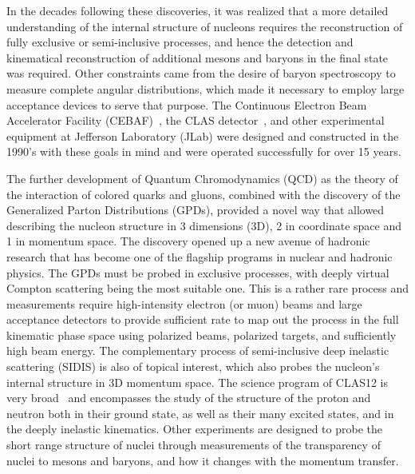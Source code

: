 \documentclass[final,3p,twocolumn]{elsarticle}
\begin{document}
In the decades following these discoveries, it was realized that a more detailed understanding of the internal
structure of nucleons requires the reconstruction of fully exclusive or semi-inclusive processes, and hence the
detection and kinematical reconstruction of additional mesons and baryons in the final state was required.  Other
constraints came from the desire of baryon spectroscopy to measure complete angular distributions, which made it
necessary to employ large acceptance devices to serve that purpose. The Continuous Electron Beam Accelerator
Facility (CEBAF)~\cite{Leemann:2001dg}, the CLAS detector~\cite{Mecking:2003zu}, and other experimental
equipment at Jefferson Laboratory (JLab) were designed and constructed in the 1990's with these goals in mind
and were operated successfully for over 15 years. 

The further development of Quantum Chromodynamics (QCD) as the theory of the interaction of colored quarks and
gluons, combined with the discovery of the Generalized Parton Distributions (GPDs), provided a novel way that allowed
describing the nucleon structure in 3 dimensions (3D), 2 in coordinate space and 1 in momentum space. The discovery
opened up a new avenue of hadronic research that has become one of the flagship programs in nuclear and hadronic
physics. The GPDs must be probed in exclusive processes, with deeply virtual Compton scattering being the most
suitable one. This is a rather rare process and measurements require high-intensity electron (or muon) beams and
large acceptance detectors to provide sufficient rate to map out the process in the full kinematic phase space using
polarized beams, polarized targets, and sufficiently high beam energy. The complementary process of semi-inclusive
deep inelastic scattering (SIDIS) is also of topical interest,  which also probes the nucleon's internal structure in 3D
momentum space. The science program of CLAS12 is very broad~\cite{Burkert:2018nvj} and encompasses the study
of the structure of the proton and neutron both in their ground state, as well as their many excited states, and in the
deeply inelastic kinematics. Other experiments are designed to probe the short range structure of nuclei through
measurements of the transparency of nuclei to mesons and baryons, and how it changes with the momentum transfer.   
\end{document}
